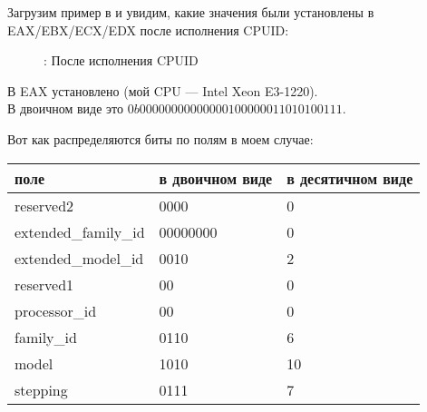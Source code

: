 ﻿\clearpage
{}
\myindex{\olly}

Загрузим пример в \olly и увидим, какие значения были установлены в EAX/EBX/ECX/EDX после исполнения CPUID: 

\begin{figure}[H]
\centering
{}
\caption{\olly: После исполнения CPUID}
\label{fig:cpuid_olly_1}
\end{figure}

В EAX установлено  (мой \ac{CPU} --- Intel Xeon E3-1220).\\
В двоичном виде это $0b0000 0000 0000 0010 0000 0110 1010 0111$.

Вот как распределяются биты по полям в моем случае:

\begin{center}
\begin{tabular}{ | l | l | l | }
\hline
\headercolor{} поле &
\headercolor{} в двоичном виде &
\headercolor{} в десятичном виде \\
\hline
reserved2		& 0000 & 0 \\
\hline
extended\_family\_id	& 00000000 & 0 \\
\hline
extended\_model\_id	& 0010 & 2 \\
\hline
reserved1		& 00 & 0 \\
\hline
processor\_id		& 00 & 0 \\
\hline
family\_id		& 0110 & 6 \\
\hline
model			& 1010 & 10 \\
\hline
stepping		& 0111 & 7 \\
\hline
\end{tabular}
\end{center}



